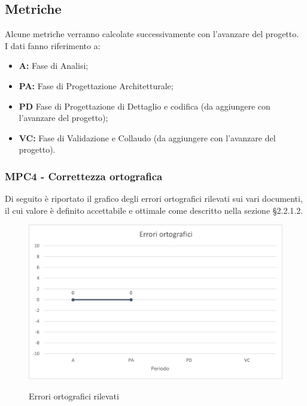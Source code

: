 \subsection{Metriche}
Alcune metriche verranno calcolate successivamente con l'avanzare del progetto.\\

I dati fanno riferimento a:
\begin{itemize}
	\item \textbf{A:} Fase di Analisi;
	\item \textbf{PA:} Fase di Progettazione Architetturale;
	\item \textbf{PD} Fase di Progettazione di Dettaglio e codifica (da aggiungere con l'avanzare del progetto);
	\item \textbf{VC: } Fase di Validazione e Collaudo (da aggiungere con l'avanzare del progetto).
\end{itemize}



\subsubsection{MPC4 - Correttezza ortografica}
Di seguito è riportato il grafico degli errori ortografici rilevati sui vari documenti, il cui valore è definito accettabile e ottimale come descritto nella sezione §2.2.1.2.\\

\begin{figure}[H]
\centering
\includegraphics[scale=0.78]{res/ResocontoAttivitaDiVerifica/res/metriche/grafici/img/correttezzaOrtografica.png}\\
\caption{Errori ortografici rilevati}
\end{figure}

